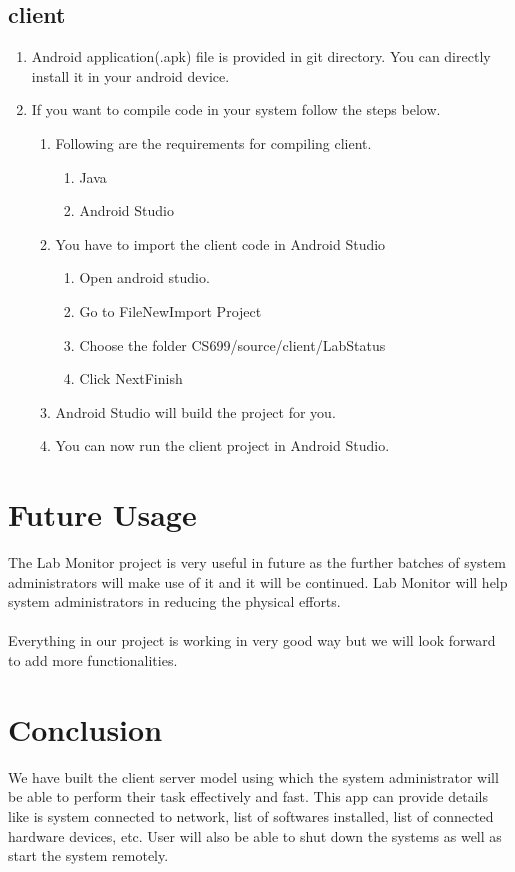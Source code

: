 \documentclass[oneside,a4paper,12pt]{article}
\begin{document}
\subsection{client}
\begin{enumerate}
    \item Android application(.apk) file is provided in git directory. You can directly install it in your android device.
    \item If you want to compile code in your system follow the steps below.
    \begin{enumerate}
        \item Following are the requirements for compiling client.
        \begin{enumerate}
            \item Java
            \item Android Studio
        \end{enumerate}
        \item You have to import the client code in Android Studio
        \begin{enumerate}
            \item Open android studio.
            \item Go to File\textrightarrow New\textrightarrow Import Project
            \item Choose the folder CS699/source/client/LabStatus
            \item Click Next\textrightarrow Finish
        \end{enumerate}
        \item Android Studio will build the project for you.
        \item You can now run the client project in Android Studio.
    \end{enumerate}
\end{enumerate}
\newpage

\section{Future Usage}
The Lab Monitor project is very useful in future as the further batches of system administrators will make use of it and it will be continued.
Lab Monitor will help system administrators in reducing the physical efforts.\\\\
Everything in our project is working in very good way but we will look forward to add more functionalities.


\newpage
\section{Conclusion}
We have built the client server model using which the system administrator will be able to perform their task effectively and fast. This app can provide details like is system connected to network, list of softwares installed, list of connected hardware devices, etc. User will also be able to shut down the systems as well as start the system remotely.
\newpage
\end{document}
